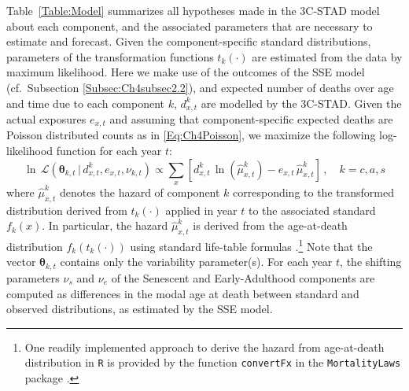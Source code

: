 \documentclass[Thesis]{subfiles}
\begin{document}
Table~\ref{Table:Model} summarizes all hypotheses made in the 3C-STAD model about each component, and the associated parameters that are necessary to estimate and forecast. Given the component-specific standard distributions, parameters of the transformation functions $t_{k}(\cdot)$ are estimated from the data by maximum likelihood. Here we make use of the outcomes of the SSE model (cf.~Subsection \ref{Subsec:Ch4subsec2.2}), and expected number of deaths over age and time due to each component $k$, $d^{k}_{x,t}$ are modelled by the 3C-STAD. Given the actual exposures $e_{x,t}$ and assuming that component-specific expected deaths are Poisson distributed counts as in \eqref{Eq:Ch4Poisson}, we maximize the following log-likelihood function for each year $t$:
% 
\begin{equation}\label{Eq:PoiLogLike}
\ln \, \mathcal{L}\left(\bm{\theta}_{k,t}\,|\, d^{k}_{x,t} , e_{x,t} , \nu_{k,t} \right) \propto \sum_{x} \left[  d^{k}_{x,t} \,
\ln \left ( \hat{\mu}^{k}_{x,t}  \right ) - e_{x,t}
\, \hat{\mu}^{k}_{x,t}  \right]  \,, \quad k=c,a,s 
\end{equation}
%
where $\hat{\mu}^{k}_{x,t}$ denotes the hazard of component $k$ corresponding to the transformed distribution derived from $t_{k}(\cdot)$ applied in year $t$ to the associated standard $f_{k}(x)$. In particular, the hazard $\hat{\mu}^k_{x,t}$ is derived from the age-at-death distribution $f_{k}(t_k(\cdot))$ using standard life-table formulas \citep{preston2001demogr}.\footnote{One readily implemented approach to derive the hazard from age-at-death distribution in \texttt{R} is provided by the function \texttt{convertFx} in the \texttt{MortalityLaws} package  \citep{pascariu2018mortalitylaws}.} Note that the vector $\bm{\theta}_{k,t}$ contains only the variability parameter(s). For each year $t$, the shifting parameters $\nu_{s}$ and $\nu_{e}$ of the Senescent and Early-Adulthood components are computed as differences in the modal age at death between standard and observed distributions, as estimated by the SSE model. 
\end{document}
